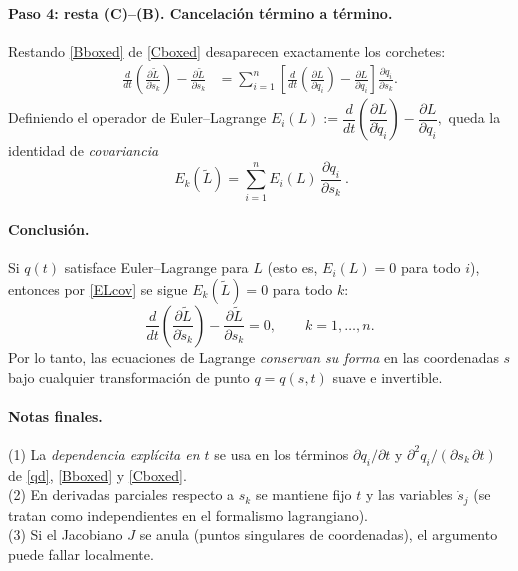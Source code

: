 \paragraph{Paso 4: resta (C)–(B). Cancelación término a término.}
Restando \eqref{Bboxed} de \eqref{Cboxed} desaparecen exactamente los corchetes:
\begin{align*}
\frac{d}{dt}\!\left(\frac{\partial \tilde L}{\partial \dot s_k}\right)
-\frac{\partial \tilde L}{\partial s_k}
&=\sum_{i=1}^n \left[
\frac{d}{dt}\!\left(\frac{\partial L}{\partial \dot q_i}\right)
-\frac{\partial L}{\partial q_i}
\right]\frac{\partial q_i}{\partial s_k}.
\end{align*}
Definiendo el operador de Euler--Lagrange
\(
E_i(L):=\dfrac{d}{dt}\!\left(\dfrac{\partial L}{\partial \dot q_i}\right)
-\dfrac{\partial L}{\partial q_i},
\)
queda la identidad de \emph{covariancia}
\begin{equation}
\label{ELcov}
\boxed{\ E_k(\tilde L)=\sum_{i=1}^n E_i(L)\,\frac{\partial q_i}{\partial s_k}\ }.
\end{equation}

\paragraph{Conclusión.}
Si $q(t)$ satisface Euler--Lagrange para $L$ (esto es, $E_i(L)=0$ para todo $i$),
entonces por \eqref{ELcov} se sigue $E_k(\tilde L)=0$ para todo $k$:
\[
\frac{d}{dt}\!\left(\frac{\partial \tilde L}{\partial \dot s_k}\right)
-\frac{\partial \tilde L}{\partial s_k}=0,\qquad k=1,\ldots,n.
\]
Por lo tanto, las ecuaciones de Lagrange \emph{conservan su forma} en las coordenadas $s$
bajo cualquier transformación de punto $q=q(s,t)$ suave e invertible.

\paragraph{Notas finales.}
(1) La \emph{dependencia explícita en $t$} se usa en los términos
$\partial q_i/\partial t$ y $\partial^2 q_i/(\partial s_k\,\partial t)$ de \eqref{qd}, \eqref{Bboxed} y \eqref{Cboxed}.\\
(2) En derivadas parciales respecto a $s_k$ se mantiene fijo $t$ y las variables $\dot s_j$
(se tratan como independientes en el formalismo lagrangiano).\\
(3) Si el Jacobiano $J$ se anula (puntos singulares de coordenadas), el argumento puede fallar localmente.
	



 \newpage





